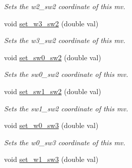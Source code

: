 \begin{DoxyCompactItemize}
\begin{DoxyCompactList}\small\item\em Sets the w2\-\_\-sw2 coordinate of this mv. \end{DoxyCompactList}\item 
\hypertarget{classe3ga_1_1mv_ae4541c2a3a10d064f1eb988e94228052}{void \hyperlink{classe3ga_1_1mv_ae4541c2a3a10d064f1eb988e94228052}{set\-\_\-w3\-\_\-sw2} (double val)}\label{classe3ga_1_1mv_ae4541c2a3a10d064f1eb988e94228052}

\begin{DoxyCompactList}\small\item\em Sets the w3\-\_\-sw2 coordinate of this mv. \end{DoxyCompactList}\item 
\hypertarget{classe3ga_1_1mv_a5f9e88cc55f2ecb1350ea9304395800c}{void \hyperlink{classe3ga_1_1mv_a5f9e88cc55f2ecb1350ea9304395800c}{set\-\_\-sw0\-\_\-sw2} (double val)}\label{classe3ga_1_1mv_a5f9e88cc55f2ecb1350ea9304395800c}

\begin{DoxyCompactList}\small\item\em Sets the sw0\-\_\-sw2 coordinate of this mv. \end{DoxyCompactList}\item 
\hypertarget{classe3ga_1_1mv_ac71c12babeba871066bbe3f64a60eff6}{void \hyperlink{classe3ga_1_1mv_ac71c12babeba871066bbe3f64a60eff6}{set\-\_\-sw1\-\_\-sw2} (double val)}\label{classe3ga_1_1mv_ac71c12babeba871066bbe3f64a60eff6}

\begin{DoxyCompactList}\small\item\em Sets the sw1\-\_\-sw2 coordinate of this mv. \end{DoxyCompactList}\item 
\hypertarget{classe3ga_1_1mv_afa3791bda07cb568601ef62628015f92}{void \hyperlink{classe3ga_1_1mv_afa3791bda07cb568601ef62628015f92}{set\-\_\-w0\-\_\-sw3} (double val)}\label{classe3ga_1_1mv_afa3791bda07cb568601ef62628015f92}

\begin{DoxyCompactList}\small\item\em Sets the w0\-\_\-sw3 coordinate of this mv. \end{DoxyCompactList}\item 
\hypertarget{classe3ga_1_1mv_ad0f4ed105844de9b0f78c5963303e73a}{void \hyperlink{classe3ga_1_1mv_ad0f4ed105844de9b0f78c5963303e73a}{set\-\_\-w1\-\_\-sw3} (double val)}\label{classe3ga_1_1mv_ad0f4ed105844de9b0f78c5963303e73a}


\end{DoxyCompactItemize}
